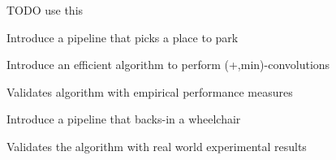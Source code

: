 TODO use this \cite{viswanathan2011navigation}



\item Introduce a pipeline that picks a place to park
\item Introduce an efficient algorithm to perform (+,min)-convolutions
\item Validates algorithm with empirical performance measures
\item Introduce a pipeline that backs-in a wheelchair
\item Validates the algorithm with real world experimental results
